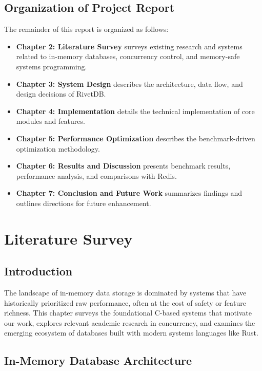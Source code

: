 \documentclass[12pt,a4paper]{report}
\begin{document}
\section{Organization of Project Report}

The remainder of this report is organized as follows:

\begin{itemize}[leftmargin=2.5em]
    \item \textbf{Chapter 2: Literature Survey} surveys existing research and systems related to in-memory databases, concurrency control, and memory-safe systems programming.
    \item \textbf{Chapter 3: System Design} describes the architecture, data flow, and design decisions of RivetDB.
    \item \textbf{Chapter 4: Implementation} details the technical implementation of core modules and features.
    \item \textbf{Chapter 5: Performance Optimization} describes the benchmark-driven optimization methodology.
    \item \textbf{Chapter 6: Results and Discussion} presents benchmark results, performance analysis, and comparisons with Redis.
    \item \textbf{Chapter 7: Conclusion and Future Work} summarizes findings and outlines directions for future enhancement.
\end{itemize}

\chapter{Literature Survey}

\section{Introduction}

The landscape of in-memory data storage is dominated by systems that have historically prioritized raw performance, often at the cost of safety or feature richness. This chapter surveys the foundational C-based systems that motivate our work, explores relevant academic research in concurrency, and examines the emerging ecosystem of databases built with modern systems languages like Rust.

\section{In-Memory Database Architecture}
\end{document}
